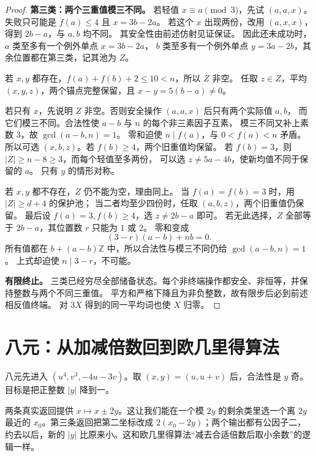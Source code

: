 \documentclass[11pt,a4paper,oneside,openany]{book}
\newcommand{\Z}{\mathbb Z}
\theoremstyle{definition}
\numberwithin{equation}{chapter}
\begin{document}
\begin{proof}
\par\noindent\textbf{第三类：两个三重值模三不同。}
若轻值 $x\equiv a\pmod3$，先试 $(a,a,x)$。
失败只可能是 $f(a)\le4$ 且 $x=3b-2a$。
若这个 $x$ 出现两份，改用 $(a,x,x)$，得到 $2b-a$，与 $a,b$ 均不同。
其安全性由前述仿射见证保证。
因此还未成功时，$a$ 类至多有一个例外单点 $x=3b-2a$，
$b$ 类至多有一个例外单点 $y=3a-2b$，其余位置都在第三类，记其池为 $Z$。

若 $x,y$ 都存在，$f(a)+f(b)+2\le10<n$，所以 $Z$ 非空。
任取 $z\in Z$，平均 $(x,y,z)$，两个锚点完整保留，且 $x-y=5(b-a)\ne0$。

若只有 $x$，先说明 $Z$ 非空。否则安全操作 $(a,a,x)$ 后只有两个实际值 $a,b$，
而它们模三不同。合法性使 $a-b$ 与 $n$ 的每个非三素因子互素，
模三不同又补上素数 $3$，故 $\gcd(a-b,n)=1$。
零和迫使 $n\mid f(a)$，与 $0<f(a)<n$ 矛盾。
所以可选 $(x,b,z)$。若 $f(b)\ge4$，两个旧重值均保留。
若 $f(b)=3$，则 $|Z|\ge n-8\ge3$，而每个轻值至多两份，
可以选 $z\ne5a-4b$，使新均值不同于保留的 $a$。
只有 $y$ 的情形对称。

若 $x,y$ 都不存在，$Z$ 仍不能为空，理由同上。
当 $f(a)=f(b)=3$ 时，用 $|Z|\ge d+4$ 的保护池；
当二者均至少四份时，任取 $(a,b,z)$，两个旧重值仍保留。
最后设 $f(a)=3,f(b)\ge4$，选 $z\ne2b-a$ 即可。
若无此选择，$Z$ 全部等于 $2b-a$，其位置数 $r$ 只能为 $1$ 或 $2$。
零和变成
\[
(3-r)(a-b)+nb=0.
\]
所有值都在 $b+(a-b)\Z$ 中，所以合法性与模三不同仍给 $\gcd(a-b,n)=1$。
上式却迫使 $n\mid3-r$，不可能。

\par\noindent\textbf{有限终止。}
三类已经穷尽全部储备状态。每个非终端操作都安全、非恒等，并保持整数与两个不同三重值。
平方和严格下降且为非负整数，故有限步后必到前述相反值终端。
对 $3X$ 得到的同一平均词也使 $X$ 归零。
\end{proof}

\section{八元：从加减倍数回到欧几里得算法}
八元先进入 $(u^4,v^3,-4u-3v)$。取 $(x,y)=(u,u+v)$ 后，合法性是 $y$ 奇。目标是把正整数 $|y|$ 降到一。

两条真实返回提供 $x\mapsto x\pm2y$。这让我们能在一个模 $2y$ 的剩余类里选一个离 $2y$ 最近的 $x_0$。第三条返回把第二坐标改成 $2(x_0-2y)$；两个输出都有公因子二，约去以后，新的 $|y|$ 比原来小。这和欧几里得算法“减去合适倍数后取小余数”的逻辑一样。
\end{document}
